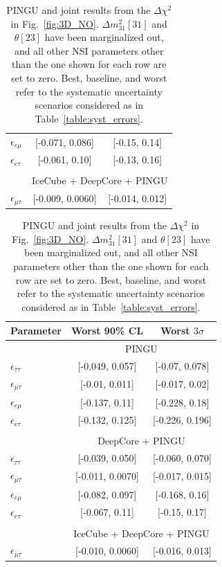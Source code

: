 \documentclass{revtex4-2}
\newcommand{\emt}{\ensuremath{\epsilon_{\mu\tau}}}
\newcommand{\eet}{\epsilon_{e\tau}}
\newcommand{\eem}{\epsilon_{e\mu}}
\newcommand{\ett}{\ensuremath{\epsilon_{\tau\tau}}}
\newcommand{\dm}{\Delta m^2_{31}}
\begin{document}
{{\begin{table}
\begin{tabular}{lcc}
       $\eem$ &    [-0.071, 0.086] &  [-0.15, 0.14]  \\
       $\eet$ &   [-0.061, 0.10] &  [-0.13, 0.16] \\\\
       & \multicolumn{2}{c}{IceCube + DeepCore + PINGU}  \\
       $\emt$ &  [-0.009, 0.0060] &  [-0.014, 0.012] \\
       \hline
    \end{tabular}
    \begin{tabular}{lcc}
       \hline 
       Parameter & Worst 90\% CL & Worst $3\sigma$\\
       \hline & \multicolumn{2}{c}{PINGU} \\
       $\ett$ &  [-0.049, 0.057] &   [-0.07, 0.078] \\
       $\emt$ &   [-0.01, 0.011] &   [-0.017, 0.02] \\
       $\eem$ &   [-0.137, 0.11] &   [-0.228, 0.18] \\
       $\eet$ &  [-0.132, 0.125] &  [-0.226, 0.196] \\\\
       & \multicolumn{2}{c}{DeepCore + PINGU} \\
       $\ett$ &   [-0.039, 0.050] &    [-0.060, 0.070] \\
       $\emt$ &  [-0.011, 0.0070] &  [-0.017, 0.015] \\
       $\eem$ &  [-0.082, 0.097] &  [-0.168, 0.16] \\
       $\eet$ &  [-0.067, 0.11] &  [-0.15, 0.17] \\\\
       & \multicolumn{2}{c}{IceCube + DeepCore + PINGU}  \\
       $\emt$ &   [-0.010, 0.0060] &  [-0.016, 0.013] \\
       \hline
    \end{tabular}
    \caption{PINGU and joint results from the $\Delta \chi^2$ in Fig.~\ref{fig:3D_NO}. $\dm[31]$ and $\theta[23]$ have been marginalized out, and all other NSI parameters other than the one shown for each row are set to zero.
    Best, baseline, and worst refer to 
    the systematic uncertainty scenarios considered as in Table~\ref{table:syst_errors}.}\label{table:PINGU_joint_results}
 \end{table}
 
}}
\end{document}
